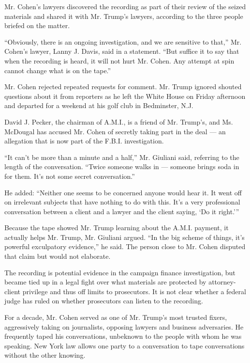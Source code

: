 Mr. Cohen's lawyers discovered the recording as part of their review of
the seized materials and shared it with Mr. Trump's lawyers, according
to the three people briefed on the matter.

``Obviously, there is an ongoing investigation, and we are sensitive to
that,'' Mr. Cohen's lawyer, Lanny J. Davis, said in a statement. ``But
suffice it to say that when the recording is heard, it will not hurt Mr.
Cohen. Any attempt at spin cannot change what is on the tape.''

Mr. Cohen rejected repeated requests for comment. Mr. Trump ignored
shouted questions about it from reporters as he left the White House on
Friday afternoon and departed for a weekend at his golf club in
Bedminster, N.J.

David J. Pecker, the chairman of A.M.I., is a friend of Mr. Trump's, and
Ms. McDougal has accused Mr. Cohen of secretly taking part in the deal
--- an allegation that is now part of the F.B.I. investigation.

``It can't be more than a minute and a half,'' Mr. Giuliani said,
referring to the length of the conversation. ``Twice someone walks in
--- someone brings soda in for them. It's not some secret
conversation.''

He added: ``Neither one seems to be concerned anyone would hear it. It
went off on irrelevant subjects that have nothing to do with this. It's
a very professional conversation between a client and a lawyer and the
client saying, `Do it right.'''

Because the tape showed Mr. Trump learning about the A.M.I. payment, it
actually helps Mr. Trump, Mr. Giuliani argued. ``In the big scheme of
things, it's powerful exculpatory evidence,'' he said. The person close
to Mr. Cohen disputed that claim but would not elaborate.

The recording is potential evidence in the campaign finance
investigation, but became tied up in a legal fight over what materials
are protected by attorney-client privilege and thus off limits to
prosecutors. It is not clear whether a federal judge has ruled on
whether prosecutors can listen to the recording.

For a decade, Mr. Cohen served as one of Mr. Trump's most trusted
fixers, aggressively taking on journalists, opposing lawyers and
business adversaries. He frequently taped his conversations, unbeknown
to the people with whom he was speaking. New York law allows one party
to a conversation to tape conversations without the other knowing.

